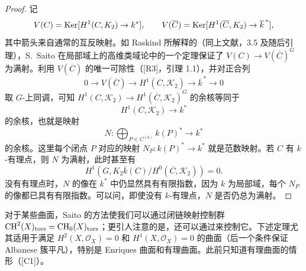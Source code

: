\begin{proof}
记
\[
 V(C)=\operatorname{Ker}[H^1(C,K_2)\to k^*],\qquad
 V(\overline C)=\operatorname{Ker}[H^1(\overline C,K_2)\to\overline k^{\,*}],
\]
其中箭头来自通常的互反映射。如 Raskind 所解释的（同上文献，3.5 及随后引理），S.~Saito 在局部域上的高维类域论中的一个定理保证了 $V(C)\to V(\overline C)^G$ 为满射。利用 $V(\overline C)$ 的唯一可除性（[R3]，引理 1.1），并对正合列
\[
 0\longrightarrow V(\overline C)\longrightarrow H^1(\overline C,\mathcal K_2)
 \longrightarrow\overline k^{\,*}\longrightarrow0
\]
取 $G$-上同调，可知 $H^1(C,\mathcal K_2)\to H^1(\overline C,\mathcal K_2)^G$ 的余核等同于
\[
 H^1(C,\mathcal K_2)\longrightarrow k^*
\]
的余核，也就是映射
\[
 N:\bigoplus_{P\in C^{(0)}}k(P)^*\longrightarrow k^*
\]
的余核。这里每个闭点 $P$ 对应的映射 $N_P:k(P)^*\to k^*$ 就是范数映射。若 $C$ 有 $k$-有理点，则 $N$ 为满射，此时甚至有
\[
 H^1(G,K_2\overline k(C)/H^0(\overline C,\mathcal K_2))=0.
\]
没有有理点时，$N$ 的像在 $k^*$ 中仍显然具有有限指数，因为 $k$ 为局部域，每个 $N_P$ 的像都已具有有限指数。可以问，即使没有 $k$-有理点，$N$ 是否仍总为满射。
\end{proof}

对于某些曲面，Saito 的方法使我们可以通过闭链映射控制群 $\operatorname{CH}^2(X)_{\mathrm{tors}}=\operatorname{CH}_0(X)_{\mathrm{tors}}$；更引人注意的是，还可以通过来控制它。下述定理尤其适用于满足 $H^2(X,\mathcal O_X)=0$ 和 $H^1(X,\mathcal O_X)=0$ 的曲面（后一个条件保证 Albanese 簇平凡），特别是 Enriques 曲面和有理曲面。此前只知道有理曲面的情形（[C1]）。

